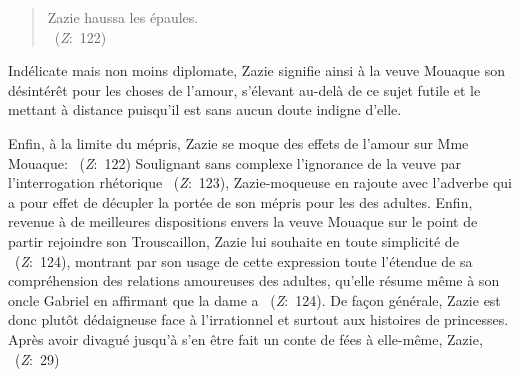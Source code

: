 \begin{quote}
  \begin{singlespace}
    \small
    Zazie haussa les épaules. \\
    ~(\textit{Z}:~122)
    \normalsize
  \end{singlespace}
\end{quote}
Indélicate mais non moins diplomate, Zazie signifie ainsi à la veuve Mouaque son désintérêt pour les choses de l'amour, s'élevant au-delà de ce sujet futile et le mettant à distance puisqu'il est sans aucun doute indigne d'elle.
\par
Enfin, à la limite du mépris, Zazie se moque des effets de l'amour sur Mme Mouaque: ~(\textit{Z}:~122)
Soulignant sans complexe l'ignorance de la veuve par l'interrogation rhétorique ~(\textit{Z}:~123), Zazie-moqueuse en rajoute avec l'adverbe  qui a pour effet de décupler la portée de son mépris pour les  des adultes.
Enfin, revenue à de meilleures dispositions envers la veuve Mouaque sur le point de partir rejoindre son Trouscaillon, Zazie lui souhaite en toute simplicité de ~(\textit{Z}:~124), montrant par son usage de cette expression toute l'étendue de sa compréhension des relations amoureuses des adultes, qu'elle résume même à son oncle Gabriel en affirmant que la dame a ~(\textit{Z}:~124).
De façon générale, Zazie est donc plutôt dédaigneuse face à l'irrationnel et surtout aux histoires de princesses. Après avoir divagué jusqu'à s'en être fait un conte de fées à elle-même, Zazie, ~(\textit{Z}:~29)

